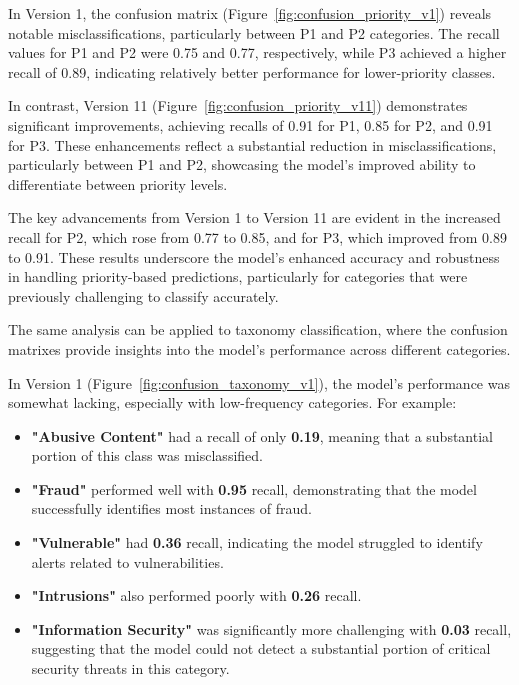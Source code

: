 In Version 1, the confusion matrix (Figure~\ref{fig:confusion_priority_v1}) reveals notable misclassifications, particularly between P1 and P2 categories. 
The recall values for P1 and P2 were 0.75 and 0.77, respectively, while P3 achieved a higher recall of 0.89, indicating relatively better performance for lower-priority classes. 

In contrast, Version 11 (Figure~\ref{fig:confusion_priority_v11}) demonstrates significant improvements, achieving recalls of 0.91 for P1, 0.85 for P2, and 0.91 for P3. 
These enhancements reflect a substantial reduction in misclassifications, particularly between P1 and P2, showcasing the model's improved ability to differentiate between priority levels. 

The key advancements from Version 1 to Version 11 are evident in the increased recall for P2, which rose from 0.77 to 0.85, and for P3, which improved from 0.89 to 0.91. 
These results underscore the model's enhanced accuracy and robustness in handling priority-based predictions, particularly for categories that were previously challenging to classify accurately.

The same analysis can be applied to taxonomy classification, where the confusion matrixes provide insights into the model's performance across different categories.

In Version 1 (Figure~\ref{fig:confusion_taxonomy_v1}), the model's performance was somewhat lacking, especially with low-frequency categories. 
For example:

\begin{itemize}
    \item \textbf{"Abusive Content"} had a recall of only \textbf{0.19}, meaning that a substantial portion of this class was misclassified.
    \item \textbf{"Fraud"} performed well with \textbf{0.95} recall, demonstrating that the model successfully identifies most instances of fraud.
    \item \textbf{"Vulnerable"} had \textbf{0.36} recall, indicating the model struggled to identify alerts related to vulnerabilities.
    \item \textbf{"Intrusions"} also performed poorly with \textbf{0.26} recall.
    \item \textbf{"Information Security"} was significantly more challenging with \textbf{0.03} recall, suggesting that the model could not detect a substantial portion of critical security threats in this category.
\end{itemize}

